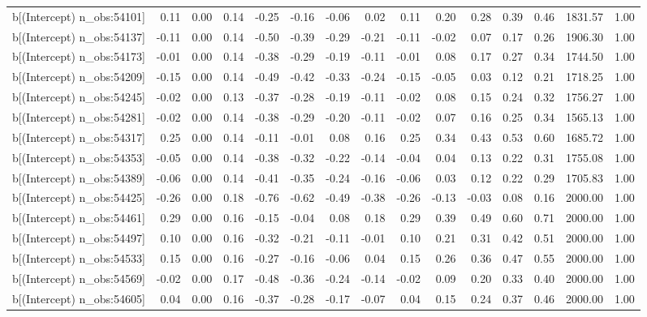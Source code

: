 \begin{table}[ht]
\begin{tabular}{rrrrrrrrrrrrrrr}
  b[(Intercept) n\_obs:54101] & 0.11 & 0.00 & 0.14 & -0.25 & -0.16 & -0.06 & 0.02 & 0.11 & 0.20 & 0.28 & 0.39 & 0.46 & 1831.57 & 1.00 \\ 
  b[(Intercept) n\_obs:54137] & -0.11 & 0.00 & 0.14 & -0.50 & -0.39 & -0.29 & -0.21 & -0.11 & -0.02 & 0.07 & 0.17 & 0.26 & 1906.30 & 1.00 \\ 
  b[(Intercept) n\_obs:54173] & -0.01 & 0.00 & 0.14 & -0.38 & -0.29 & -0.19 & -0.11 & -0.01 & 0.08 & 0.17 & 0.27 & 0.34 & 1744.50 & 1.00 \\ 
  b[(Intercept) n\_obs:54209] & -0.15 & 0.00 & 0.14 & -0.49 & -0.42 & -0.33 & -0.24 & -0.15 & -0.05 & 0.03 & 0.12 & 0.21 & 1718.25 & 1.00 \\ 
  b[(Intercept) n\_obs:54245] & -0.02 & 0.00 & 0.13 & -0.37 & -0.28 & -0.19 & -0.11 & -0.02 & 0.08 & 0.15 & 0.24 & 0.32 & 1756.27 & 1.00 \\ 
  b[(Intercept) n\_obs:54281] & -0.02 & 0.00 & 0.14 & -0.38 & -0.29 & -0.20 & -0.11 & -0.02 & 0.07 & 0.16 & 0.25 & 0.34 & 1565.13 & 1.00 \\ 
  b[(Intercept) n\_obs:54317] & 0.25 & 0.00 & 0.14 & -0.11 & -0.01 & 0.08 & 0.16 & 0.25 & 0.34 & 0.43 & 0.53 & 0.60 & 1685.72 & 1.00 \\ 
  b[(Intercept) n\_obs:54353] & -0.05 & 0.00 & 0.14 & -0.38 & -0.32 & -0.22 & -0.14 & -0.04 & 0.04 & 0.13 & 0.22 & 0.31 & 1755.08 & 1.00 \\ 
  b[(Intercept) n\_obs:54389] & -0.06 & 0.00 & 0.14 & -0.41 & -0.35 & -0.24 & -0.16 & -0.06 & 0.03 & 0.12 & 0.22 & 0.29 & 1705.83 & 1.00 \\ 
  b[(Intercept) n\_obs:54425] & -0.26 & 0.00 & 0.18 & -0.76 & -0.62 & -0.49 & -0.38 & -0.26 & -0.13 & -0.03 & 0.08 & 0.16 & 2000.00 & 1.00 \\ 
  b[(Intercept) n\_obs:54461] & 0.29 & 0.00 & 0.16 & -0.15 & -0.04 & 0.08 & 0.18 & 0.29 & 0.39 & 0.49 & 0.60 & 0.71 & 2000.00 & 1.00 \\ 
  b[(Intercept) n\_obs:54497] & 0.10 & 0.00 & 0.16 & -0.32 & -0.21 & -0.11 & -0.01 & 0.10 & 0.21 & 0.31 & 0.42 & 0.51 & 2000.00 & 1.00 \\ 
  b[(Intercept) n\_obs:54533] & 0.15 & 0.00 & 0.16 & -0.27 & -0.16 & -0.06 & 0.04 & 0.15 & 0.26 & 0.36 & 0.47 & 0.55 & 2000.00 & 1.00 \\ 
  b[(Intercept) n\_obs:54569] & -0.02 & 0.00 & 0.17 & -0.48 & -0.36 & -0.24 & -0.14 & -0.02 & 0.09 & 0.20 & 0.33 & 0.40 & 2000.00 & 1.00 \\ 
  b[(Intercept) n\_obs:54605] & 0.04 & 0.00 & 0.16 & -0.37 & -0.28 & -0.17 & -0.07 & 0.04 & 0.15 & 0.24 & 0.37 & 0.46 & 2000.00 & 1.00 \\ 

\end{tabular}
\end{table}
